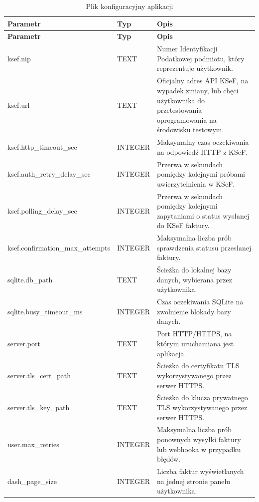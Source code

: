 \begin{small}
\begin{longtable}{>{\raggedright\arraybackslash}p{5.3cm} >{\raggedright\arraybackslash}p{1.7cm} >{\raggedright\arraybackslash}p{6cm}}
\caption{Plik konfiguracyjny aplikacji}
\label{tab:config_fields} \\
\toprule
\textbf{Parametr} & \textbf{Typ} & \textbf{Opis} \\
\midrule
\endfirsthead

\toprule
\textbf{Parametr} & \textbf{Typ} & \textbf{Opis} \\
\midrule
\endhead

\bottomrule
\endfoot

ksef.nip & TEXT & Numer Identyfikacji Podatkowej podmiotu, który reprezentuje użytkownik. \\
ksef.url & TEXT & Oficjalny adres API KSeF, na wypadek zmiany, lub chęci użytkownika do przetestowania oprogramowania na środowisku testowym. \\
ksef.http\_timeout\_sec & INTEGER & Maksymalny czas oczekiwania na odpowiedź HTTP z KSeF. \\
ksef.auth\_retry\_delay\_sec & INTEGER & Przerwa w sekundach pomiędzy kolejnymi próbami uwierzytelnienia w KSeF. \\
ksef.polling\_delay\_sec & INTEGER & Przerwa w sekundach pomiędzy kolejnymi zapytaniami o status wysłanej do KSeF faktury. \\
ksef.confirmation\_max\_attempts & INTEGER & Maksymalna liczba prób sprawdzenia statusu przesłanej faktury. \\
sqlite.db\_path & TEXT & Ścieżka do lokalnej bazy danych, wybierana przez użytkownika. \\
sqlite.busy\_timeout\_ms & INTEGER & Czas oczekiwania SQLite na zwolnienie blokady bazy danych. \\
server.port & TEXT & Port HTTP/HTTPS, na którym uruchamiana jest aplikacja. \\
server.tls\_cert\_path & TEXT & Ścieżka do certyfikatu TLS wykorzystywanego przez serwer HTTPS. \\
server.tls\_key\_path & TEXT & Ścieżka do klucza prywatnego TLS wykorzystywanego przez serwer HTTPS. \\
user.max\_retries & INTEGER & Maksymalna liczba prób ponownych wysyłki faktury lub webhooka w przypadku błędów. \\
dash\_page\_size & INTEGER & Liczba faktur wyświetlanych na jednej stronie panelu użytkownika. \\

\end{longtable}
\end{small}
